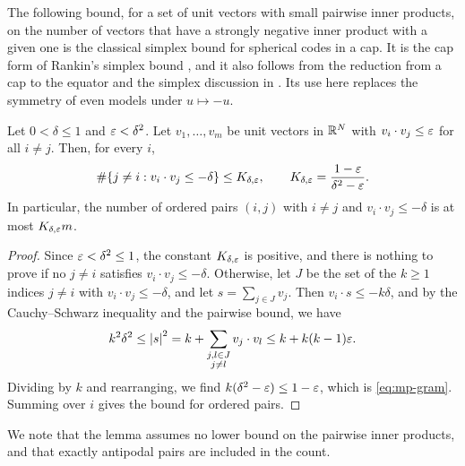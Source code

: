 The following bound, for a set of unit vectors with small pairwise inner products, on the number of vectors that have a strongly negative inner product with a given one is the classical simplex bound for spherical codes in a cap. It is the cap form of Rankin's simplex bound \cite[Theorem~1(ii) and Lemma~2]{Rankin1955}, and it also follows from the reduction from a cap to the equator and the simplex discussion in \cite[Theorem~5 and Section~5, item~3]{BargMusin2007}.
Its use here replaces the symmetry of even models under $u\mapsto-u$.

\begin{lemma}\label{lem:mp-gram}
Let $0<\delta\le1$ and $\varepsilon<\delta^2$. Let $v_1,\dots,v_m$ be unit vectors in $\mathbb R^N$ with $v_i\cdot v_j\le\varepsilon$ for all $i\ne j$. Then, for every $i$,
\begin{equation}\label{eq:mp-gram}
\#\{j\ne i:v_i\cdot v_j\le-\delta\}\le K_{\delta,\varepsilon},\qquad K_{\delta,\varepsilon}=\frac{1-\varepsilon}{\delta^2-\varepsilon}.
\end{equation}
In particular, the number of ordered pairs $(i,j)$ with $i\ne j$ and $v_i\cdot v_j\le-\delta$ is at most $K_{\delta,\varepsilon}m$.
\end{lemma}

\begin{proof}
Since $\varepsilon<\delta^2\le1$, the constant $K_{\delta,\varepsilon}$ is positive, and there is nothing to prove if no $j\ne i$ satisfies $v_i\cdot v_j\le-\delta$. Otherwise, let $J$ be the set of the $k\ge1$ indices $j\ne i$ with $v_i\cdot v_j\le-\delta$, and let $s=\sum_{j\in J}v_j$. Then $v_i\cdot s\le-k\delta$, and by the Cauchy--Schwarz inequality and the pairwise bound, we have
\[
k^2\delta^2\le\left|s\right|^2=k+\sum_{\substack{j,l\in J\\ j\ne l}}v_j\cdot v_l\le k+k(k-1)\varepsilon.
\]
Dividing by $k$ and rearranging, we find $k(\delta^2-\varepsilon)\le1-\varepsilon$, which is \eqref{eq:mp-gram}. Summing over $i$ gives the bound for ordered pairs.
\end{proof}

We note that the lemma assumes no lower bound on the pairwise inner products, and that exactly antipodal pairs are included in the count.

